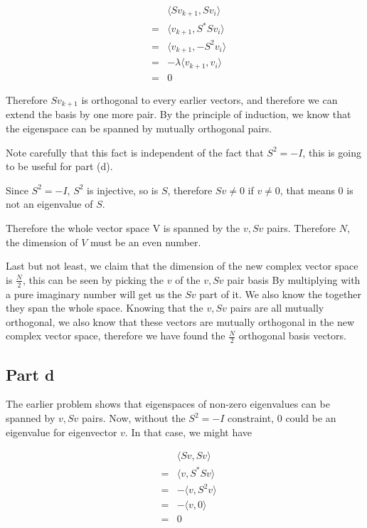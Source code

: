 \begin{eqnarray*}
  & & \langle Sv_{k+1}, Sv_i \rangle \\
  &=& \langle v_{k+1}, S^*S v_i \rangle \\
  &=& \langle v_{k+1}, -S^2 v_i \rangle \\
  &=& -\lambda \langle v_{k+1}, v_i \rangle \\
  &=& 0
\end{eqnarray*}

Therefore $ Sv_{k+1} $ is orthogonal to every earlier vectors, and therefore we can extend the basis by one more pair. By the principle of induction, we know that the eigenspace can be spanned by mutually orthogonal pairs.

Note carefully that this fact is independent of the fact that $ S^2 = -I $, this is going to be useful for part (d).

Since $ S^2 = -I $, $ S^2 $ is injective, so is $ S $, therefore $ Sv \ne 0 $ if $ v \ne 0 $, that means 0 is not an eigenvalue of $ S $. 

Therefore the whole vector space V is spanned by the $ v, Sv $ pairs. Therefore $ N $, the dimension of $ V $ must be an even number.

Last but not least, we claim that the dimension of the new complex vector space is $ \frac{N}{2} $, this can be seen by picking the $ v $ of the $ v, Sv $ pair basis By multiplying with a pure imaginary number will get us the $ Sv $ part of it. We also know the together they span the whole space. Knowing that the $ v, Sv $ pairs are all mutually orthogonal, we also know that these vectors are mutually orthogonal in the new complex vector space, therefore we have found the $ \frac{N}{2} $ orthogonal basis vectors.

\subsection*{Part d}
The earlier problem shows that eigenspaces of non-zero eigenvalues can be spanned by $ v, Sv $ pairs. Now, without the $ S^2 = -I $ constraint, 0 could be an eigenvalue for eigenvector $ v $. In that case, we might have

\begin{eqnarray*}
  & & \langle Sv, Sv \rangle \\
  &=& \langle v, S^*Sv \rangle \\
  &=& -\langle v, S^2v \rangle \\
  &=& -\langle v, 0 \rangle \\
  &=& 0
\end{eqnarray*}

